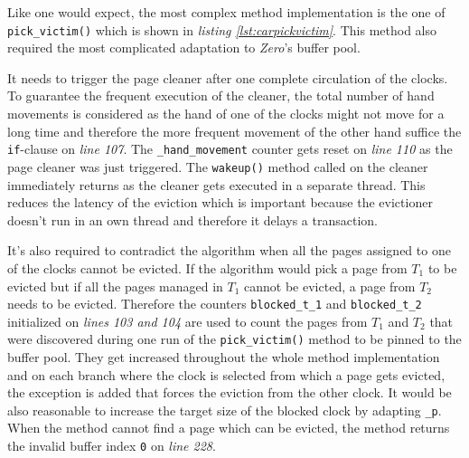 \begin{@empty}
    \lstset{
        language = [ISO]C++,
        style = basic
    }
    \begin{code}[ht!]
        \caption{Implementation of \lstinline{page_evictioner_car::pick_victim()}}
        
    \end{code}
    \begin{code}[ht!]
        \ContinuedFloat
        \caption{Implementation of \lstinline{page_evictioner_car::pick_victim()} (cont.)} \label{lst:carpickvictim}
        
    \end{code}
\end{@empty}

    Like one would expect, the most complex method implementation is the one of \lstinline{pick_victim()} which is shown in \emph{listing \ref{lst:carpickvictim}}. This method also required the most complicated adaptation to \emph{Zero}'s buffer pool.

    It needs to trigger the page cleaner after one complete circulation of the clocks. To guarantee the frequent execution of the cleaner, the total number of hand movements is considered as the hand of one of the clocks might not move for a long time and therefore the more frequent movement of the other hand suffice the \lstinline{if}-clause on \emph{line 107}. The \lstinline{_hand_movement} counter gets reset on \emph{line 110} as the page cleaner was just triggered. The \lstinline{wakeup()} method called on the cleaner immediately returns as the cleaner gets executed in a separate thread. This reduces the latency of the eviction which is important because the evictioner doesn't run in an own thread and therefore it delays a transaction.

    It's also required to contradict the algorithm when all the pages assigned to one of the clocks cannot be evicted. If the algorithm would pick a page from $T_1$  to be evicted but if all the pages managed in $T_1$ cannot be evicted, a page from $T_2$ needs to be evicted. Therefore the counters \lstinline{blocked_t_1} and \lstinline{blocked_t_2} initialized on \emph{lines 103 and 104} are used to count the pages from $T_1$ and $T_2$ that were discovered during one run of the \lstinline{pick_victim()} method to be pinned to the buffer pool. They get increased throughout the whole method implementation and on each branch where the clock is selected from which a page gets evicted, the exception is added that forces the eviction from the other clock. It would be also reasonable to increase the target size of the blocked clock by adapting \lstinline{_p}. When the method cannot find a page which can be evicted, the method returns the invalid buffer index \lstinline{0} on \emph{line 228}.

